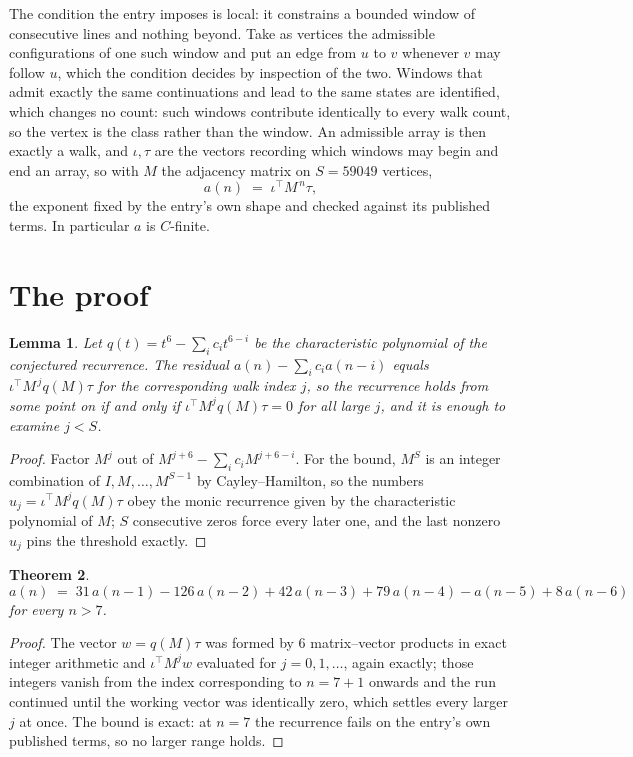 \documentclass[11pt,a4paper]{article}
\theoremstyle{plain}
\newtheorem{theorem}{Theorem}
\newtheorem{lemma}[theorem]{Lemma}
\theoremstyle{definition}
\begin{document}
The condition the entry imposes is local: it constrains a bounded window of consecutive lines and nothing beyond. Take as vertices the admissible configurations of one such window and put an edge from $u$ to $v$ whenever $v$ may follow $u$, which the condition decides by inspection of the two. Windows that admit exactly the same continuations and lead to the same states are identified, which changes no count: such windows contribute identically to every walk count, so the vertex is the class rather than the window.
An admissible array is then exactly a walk, and $\iota,\tau$ are the vectors recording which windows may begin and end an array, so with $M$ the adjacency matrix on $S=59049$ vertices,
\[
a(n)\;=\;\iota^{\!\top}M^{\,n}\tau ,
\]
the exponent fixed by the entry's own shape and checked against its published terms. In
particular $a$ is $C$-finite.

\section{The proof}

\begin{lemma}\label{lem:crit}
Let $q(t)=t^{6}-\sum_i c_it^{6-i}$ be the characteristic polynomial of the
conjectured recurrence. The residual $a(n)-\sum_ic_ia(n-i)$ equals
$\iota^{\!\top}M^{\,j}q(M)\tau$ for the corresponding walk index $j$, so the recurrence
holds from some point on if and only if $\iota^{\!\top}M^{j}q(M)\tau=0$ for all large $j$,
and it is enough to examine $j<S$.
\end{lemma}

\begin{proof}
Factor $M^{j}$ out of $M^{j+6}-\sum_ic_iM^{j+6-i}$. For the bound, $M^{S}$
is an integer combination of $I,M,\dots,M^{S-1}$ by Cayley--Hamilton, so the numbers
$u_j=\iota^{\!\top}M^{j}q(M)\tau$ obey the monic recurrence given by the characteristic
polynomial of $M$; $S$ consecutive zeros force every later one, and the last nonzero $u_j$
pins the threshold exactly.
\end{proof}

\begin{theorem}
\[
a(n)\;=\;31\,a(n-1) - 126\,a(n-2) + 42\,a(n-3) + 79\,a(n-4) - a(n-5) + 8\,a(n-6)
\]
for every $n>7$.
\end{theorem}

\begin{proof}
The vector $w=q(M)\tau$ was formed by $6$ matrix--vector products in exact integer
arithmetic and $\iota^{\!\top}M^{j}w$ evaluated for $j=0,1,\dots$, again exactly; those
integers vanish from the index corresponding to $n=7+1$ onwards and the run continued
until the working vector was identically zero, which settles every larger $j$ at once. The bound is exact: at $n=7$ the recurrence fails on the entry's own published terms, so no larger range holds.
\end{proof}
\end{document}
